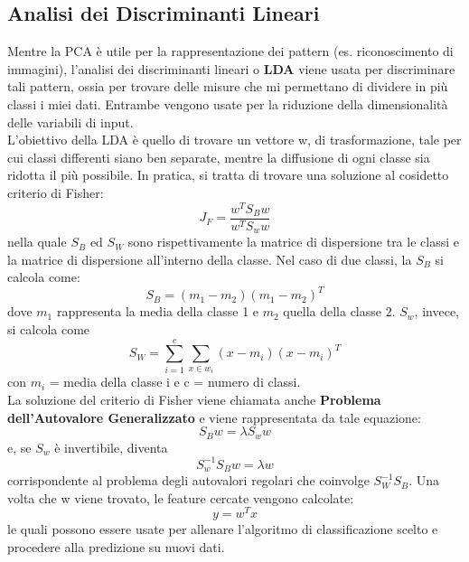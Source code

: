 \subsection{Analisi dei Discriminanti Lineari}\label{Fisher}
Mentre la PCA è utile per la rappresentazione dei pattern (es. riconoscimento di immagini), l'analisi dei discriminanti lineari o \textbf{LDA} viene usata per discriminare tali pattern, ossia per trovare delle misure che mi permettano di dividere in più classi i miei dati. Entrambe vengono usate per la riduzione della dimensionalità delle variabili di input.\\
L'obiettivo della LDA è quello di trovare un vettore w, di trasformazione, tale per cui classi differenti siano ben separate, mentre la diffusione di ogni classe sia ridotta il più possibile. In pratica, si tratta di trovare una soluzione al cosidetto criterio di Fisher: \begin{equation} J_F = \dfrac{w^TS_Bw}{w^TS_ww}  \end{equation} nella quale $S_B$ ed $S_W$ sono rispettivamente la matrice di dispersione tra le classi e la matrice di dispersione all'interno della classe. Nel caso di due classi, la $S_B$ si calcola come: \begin{equation} S_B = (m_1 - m_2)(m_1 - m_2)^T \end{equation} dove $m_1$ rappresenta la media della classe 1 e $m_2$ quella della classe 2. $S_w$, invece, si calcola come \begin{equation}S_W = \sum_{i=1}^{c} \sum_{x \in w_i}^{} (x - m_i)(x-m_i)^T\end{equation} con $m_i$ = media della classe i e c = numero di classi.\\
La soluzione del criterio di Fisher viene chiamata anche \textbf{Problema dell'Autovalore Generalizzato} e viene rappresentata da tale equazione: \begin{equation}S_Bw=\lambda S_ww\end{equation} e, se $S_w$ è invertibile, diventa \begin{equation}S_w^{-1}S_Bw=\lambda w\end{equation} corrispondente al problema degli autovalori regolari che coinvolge $S_W^{-1}S_B$. Una volta che w viene trovato, le feature cercate vengono calcolate: \begin{equation}y = w^Tx\end{equation} le quali possono essere usate per allenare l'algoritmo di classificazione scelto e procedere alla predizione su nuovi dati.\\
